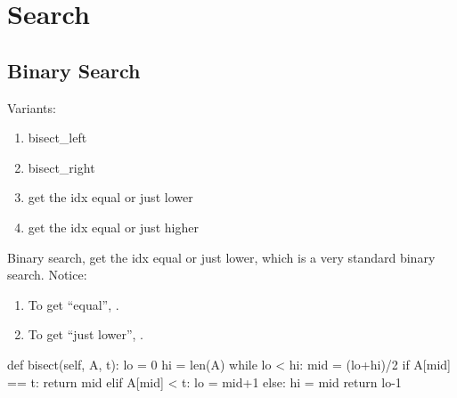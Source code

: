 \chapter{Search}

\section{Binary Search}
Variants:
\begin{enumerate}
\item bisect\_left
\item bisect\_right
\item get the idx equal or just lower 
\item get the idx equal or just higher 
\end{enumerate}
Binary search, get the idx equal or just lower, which is a very standard binary search. Notice:
\begin{enumerate}
\item To get ``equal'', .
\item To get ``just lower'', .
\end{enumerate}
\begin{python}
def bisect(self, A, t):
    lo = 0
    hi = len(A)
    while lo < hi:
        mid = (lo+hi)/2
        if A[mid] == t:
            return mid
        elif A[mid] < t:
            lo = mid+1
        else:
            hi = mid
    return lo-1
\end{python}
